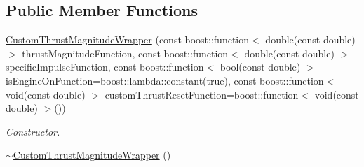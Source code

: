 \subsection*{Public Member Functions}
\begin{DoxyCompactItemize}
\item 
\hyperlink{classtudat_1_1propulsion_1_1CustomThrustMagnitudeWrapper_a1c244d23673583d300da50ae9a5317b2}{Custom\+Thrust\+Magnitude\+Wrapper} (const boost\+::function$<$ double(const double) $>$ thrust\+Magnitude\+Function, const boost\+::function$<$ double(const double) $>$ specific\+Impulse\+Function, const boost\+::function$<$ bool(const double) $>$ is\+Engine\+On\+Function=boost\+::lambda\+::constant(true), const boost\+::function$<$ void(const double) $>$ custom\+Thrust\+Reset\+Function=boost\+::function$<$ void(const double) $>$())
\begin{DoxyCompactList}\small\item\em Constructor. \end{DoxyCompactList}\item 
\hyperlink{classtudat_1_1propulsion_1_1CustomThrustMagnitudeWrapper_a9614b524a326593549730d15c6708ae2}{$\sim$\+Custom\+Thrust\+Magnitude\+Wrapper} ()\hypertarget{classtudat_1_1propulsion_1_1CustomThrustMagnitudeWrapper_a9614b524a326593549730d15c6708ae2}{}\label{classtudat_1_1propulsion_1_1CustomThrustMagnitudeWrapper_a9614b524a326593549730d15c6708ae2}


\end{DoxyCompactItemize}
